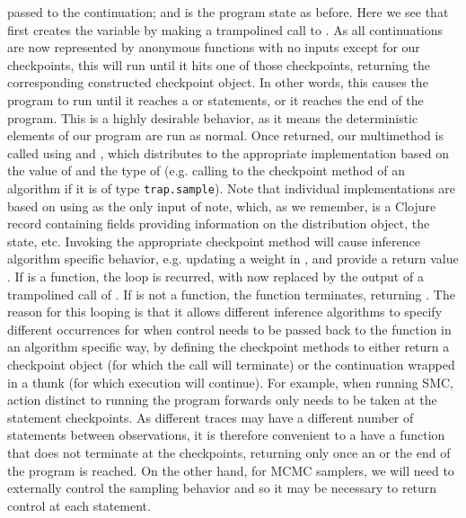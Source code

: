 passed to the continuation; and \angstate is the program state as before.  Here we see that 
first creates the variable  by making a trampolined call to .  As all continuations are now
represented by anonymous functions with no inputs except for our checkpoints, this will run until it
hits one of those checkpoints, returning the corresponding constructed checkpoint object.  In other words,
this causes the program to run until it reaches a \sample or \observe statements, or it reaches the end of the
program.  This is a highly desirable behavior, as it means the deterministic elements of our program
are run as normal.  Once returned, our multimethod \checkpoint is called using  and
, which distributes to the appropriate \checkpoint implementation based on the value of
 and the type of  (e.g. calling to the \sample checkpoint method of an algorithm 
if it is of type  {\small \texttt{trap.sample}}).  Note that individual \checkpoint implementations
are based on using  as the only input of note, which, as we remember, is a Clojure record
containing fields providing information on the distribution object, the state, etc.
Invoking the appropriate checkpoint method will cause
inference algorithm specific behavior, e.g. updating a weight in \angstate, and provide a return value
.  If  is a function, the loop
is recurred, with  now replaced by the output of a trampolined call of .  If  is
not a function, the  function terminates, returning .  The reason for this looping is
that it allows different inference algorithms to specify different occurrences for when control needs to
be passed back to the \anginfer function in an algorithm specific way, by defining the checkpoint methods
to either return a checkpoint object (for which the  call will terminate) or the continuation
wrapped in a thunk (for which execution will continue).  For example, when running SMC,
action distinct to running the program forwards only needs to be taken at the \observe statement 
checkpoints.  As different traces may have a different number of \sample statements between observations,
it is therefore convenient to a have a function that does not terminate at the \sample checkpoints, returning
only once an \observe or the end of the program is reached.  On the other hand, for MCMC samplers, we
will need to externally control the sampling behavior and so it may be necessary to return control at each
\sample statement.

